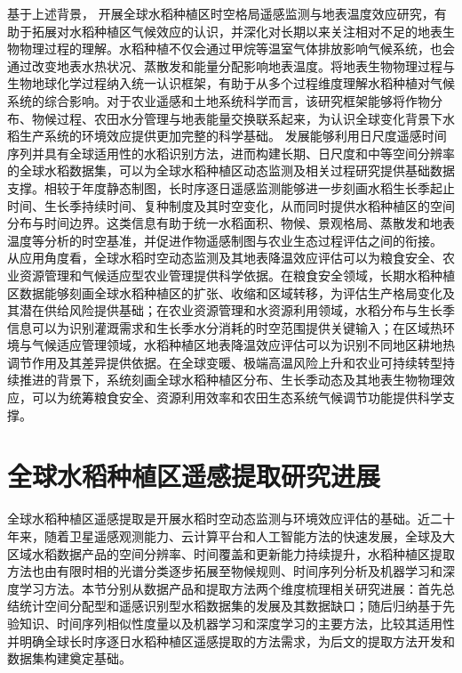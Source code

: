 基于上述背景，
开展全球水稻种植区时空格局遥感监测与地表温度效应研究，有助于拓展对水稻种植区气候效应的认识，并深化对长期以来关注相对不足的地表生物物理过程的理解。水稻种植不仅会通过甲烷等温室气体排放影响气候系统，也会通过改变地表水热状况、蒸散发和能量分配影响地表温度。将地表生物物理过程与生物地球化学过程纳入统一认识框架，有助于从多个过程维度理解水稻种植对气候系统的综合影响。对于农业遥感和土地系统科学而言，该研究框架能够将作物分布、物候过程、农田水分管理与地表能量交换联系起来，为认识全球变化背景下水稻生产系统的环境效应提供更加完整的科学基础。
发展能够利用日尺度遥感时间序列并具有全球适用性的水稻识别方法，进而构建长期、日尺度和中等空间分辨率的全球水稻数据集，可以为全球水稻种植区动态监测及相关过程研究提供基础数据支撑。相较于年度静态制图，长时序逐日遥感监测能够进一步刻画水稻生长季起止时间、生长季持续时间、复种制度及其时空变化，从而同时提供水稻种植区的空间分布与时间边界。这类信息有助于统一水稻面积、物候、景观格局、蒸散发和地表温度等分析的时空基准，并促进作物遥感制图与农业生态过程评估之间的衔接。
从应用角度看，全球水稻时空动态监测及其地表降温效应评估可以为粮食安全、农业资源管理和气候适应型农业管理提供科学依据。在粮食安全领域，长期水稻种植区数据能够刻画全球水稻种植区的扩张、收缩和区域转移，为评估生产格局变化及其潜在供给风险提供基础；在农业资源管理和水资源利用领域，水稻分布与生长季信息可以为识别灌溉需求和生长季水分消耗的时空范围提供关键输入；在区域热环境与气候适应管理领域，水稻种植区地表降温效应评估可以为识别不同地区耕地热调节作用及其差异提供依据。在全球变暖、极端高温风险上升和农业可持续转型持续推进的背景下，系统刻画全球水稻种植区分布、生长季动态及其地表生物物理效应，可以为统筹粮食安全、资源利用效率和农田生态系统气候调节功能提供科学支撑。

\section{全球水稻种植区遥感提取研究进展}

全球水稻种植区遥感提取是开展水稻时空动态监测与环境效应评估的基础。近二十年来，随着卫星遥感观测能力、云计算平台和人工智能方法的快速发展，全球及大区域水稻数据产品的空间分辨率、时间覆盖和更新能力持续提升，水稻种植区提取方法也由有限时相的光谱分类逐步拓展至物候规则、时间序列分析及机器学习和深度学习方法\cite{Dong2016,Fang2024Review}。本节分别从数据产品和提取方法两个维度梳理相关研究进展：首先总结统计空间分配型和遥感识别型水稻数据集的发展及其数据缺口；随后归纳基于先验知识、时间序列相似性度量以及机器学习和深度学习的主要方法，比较其适用性并明确全球长时序逐日水稻种植区遥感提取的方法需求，为后文的提取方法开发和数据集构建奠定基础。

